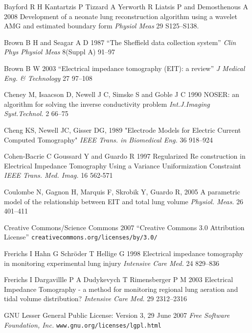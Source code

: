 \documentclass[12pt]{iopart}
\begin{document}
\item[]
Bayford R H Kantartzis P Tizzard A Yerworth R Liatsis P and Demosthenous A
 2008
Development of a neonate lung reconstruction algorithm using a wavelet
 AMG and estimated boundary form
{\em  Physiol Meas} 29 S125--S138.


\item[]
Brown B H and Seagar A D 1987 
``The Sheffield data collection system''
{\em Clin Phys Physiol Meas}
 8(Suppl A) 91--97

\item[]
Brown B W 2003
``Electrical impedance tomography (EIT): a review''
{\em J Medical Eng. \& Technology}
27 97--108


\item[]
Cheney M, Isaacson D, Newell J C, Simske S and Goble J C 1990
NOSER: an algorithm for solving the inverse conductivity problem
{\em Int.J.Imaging Syst.Technol.} 
2 66--75

\item[]
Cheng KS, Newell JC, Gisser DG, 1989
"Electrode Models for Electric Current Computed Tomography"
{\em IEEE Trans. in Biomedical Eng.}
36 918--924


\item[]
Cohen-Bacrie C  Goussard Y and Guardo R
1997
Regularized Re construction in Electrical
Impedance Tomography Using a Variance
Uniformization Constraint 
{\em IEEE Trans. Med. Imag.} 16 562-571

\item[]
Coulombe N, Gagnon H, Marquis F, Skrobik Y, Guardo R, 2005
A parametric model of the relationship between EIT and total lung volume
{\em Physiol. Meas.}
26 401--411


\item[]
Creative Commons/Science Commons 2007
``Creative Commons 3.0 Attribution License''
\verb+creativecommons.org/licenses/by/3.0/+

\item[]
Frerichs I  Hahn G Schr\"oder T Hellige G 1998
Electrical impedance tomography in
monitoring experimental lung injury
{\em Intensive Care Med.}
24 829--836

\item[]
Frerichs I Dargavillle P A Dudykevych T Rimensberger P M 2003
Electrical Impedance Tomography - a method for monitoring
regional lung aeration and tidal volume distribution?
{\em  Intensive Care Med.}
29 2312--2316

\item[]
GNU Lesser General Public License: Version 3, 29 June 2007
{\em Free Software Foundation, Inc.}
\verb+www.gnu.org/licenses/lgpl.html+
\end{document}

